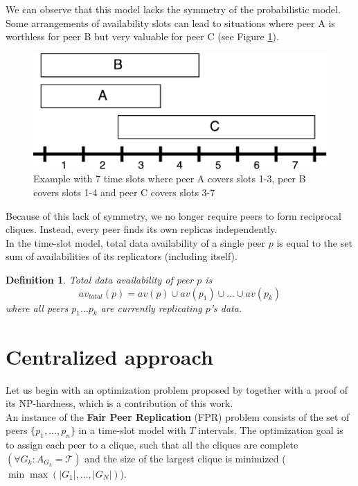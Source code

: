 \documentclass{pracamgren}
\newcounter{collective_ctr} \numberwithin{collective_ctr}{chapter}
\newtheorem{definition}[collective_ctr]{Definition}
\begin{document}
We can observe that this model lacks the symmetry of the probabilistic model. Some arrangements of availability slots can lead to situations where peer A is worthless for peer B but very valuable for peer C (see Figure \ref{fig:abc}).\\

\begin{figure}[h]
\centering
\includegraphics{abc.pdf}
\caption{Example with 7 time slots where peer A covers slots 1-3, peer B covers slots 1-4 and peer C covers slots 3-7}
\label{fig:abc}
\end{figure}

Because of this lack of symmetry, we no longer require peers to form reciprocal cliques. Instead, every peer finds its own replicas independently.\\

In the time-slot model, total data availability of a single peer $p$ is equal to the set sum of availabilities of its replicators (including itself).

\begin{definition}
Total data availability of peer $p$ is
$$av_{total}(p) = av(p) \cup av(p_1) \cup \ldots \cup av(p_k)$$
where all peers $p_1\ldots p_k$ are currently replicating $p$'s data.
\end{definition}
 
\section{Centralized approach}\label{sect:centralized}


Let us begin with an optimization problem proposed by \cite{krz} together with a proof of its NP-hardness, which is a contribution of this work.\\

An instance of the {\bf Fair Peer Replication} (FPR) problem consists of the set of peers $\{p_1,\ldots,p_n\}$ in a time-slot model with $T$ intervals. The optimization goal is to assign each peer to a clique, such that all the cliques are complete $(\forall G_k:A_{G_k} = \mathcal{T})$ and the size of the largest clique is minimized ($\min\max(|G_1|,\ldots,|G_N|)$).\\
\end{document}
